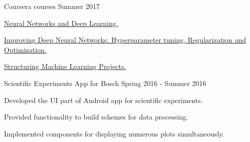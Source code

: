 

\begin{cvprojects}

    \cvproject
    {Coursera courses} %
    {Summer 2017} %
    {
    \begin{cvitems} %
        \item {\href{https://www.coursera.org/account/accomplishments/certificate/2CZYKZ48RVVF}{Neural Networks and Deep Learning.}}
        \item {\href{https://www.coursera.org/account/accomplishments/certificate/HKWGMRF5H2MQ}{Improving Deep Neural Networks: Hyperparameter tuning, Regularization and Optimization.}}
        \item {\href{https://www.coursera.org/account/accomplishments/certificate/T4CAU7ZQRG7C}{Structuring Machine Learning Projects.}}
    \end{cvitems}
    }

    \cvproject
    {Scientific Experiments App for Bosch} %
    {Spring 2016 - Summer 2016} %
    {
    \begin{cvitems} %
        \item {Developed the UI part of Android app for scientific experiments.}
        \item {Provided functionality to build schemes for data processing.}
        \item {Implemented components for displaying numerous plots simultaneously.}
    \end{cvitems}
    }

\end{cvprojects}
